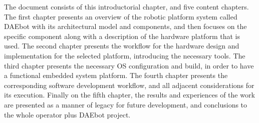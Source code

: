 The document consists of this introductorial chapter, and five content chapters. The first chapter
presents an overview of the robotic platform system called DAEbot with its architectural model and
components, and then focuses on the specific component along with a description of the hardware
platform that is used. The second chapter presents the workflow for the hardware design and
implementation for the selected platform, introducing the necessary tools. The third chapter
presents the necessary OS configuration and build, in order to have a functional embedded system
platform. The fourth chapter presents the corresponding software development workflow, and all
adjacent considerations for its execution. Finally on the fifth chapter, the results and
experiences of the work are presented as a manner of legacy for future development, and conclusions
to the whole operator plus DAEbot project.
